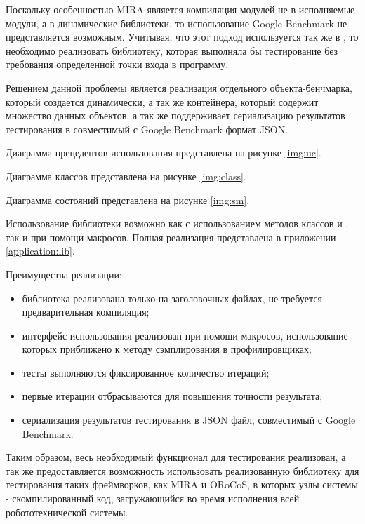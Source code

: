 Поскольку особенностью MIRA является компиляция модулей не в исполняемые модули, а в динамические библиотеки, то использование Google Benchmark не представляется возможным. Учитывая, что этот подход используется так же в \toolchain{}, то необходимо реализовать библиотеку, которая выполняла бы тестирование без требования определенной точки входа в программу.

Решением данной проблемы является реализация отдельного объекта-бенчмарка, который создается динамически, а так же контейнера, который содержит множество данных объектов, а так же поддерживает сериализацию результатов тестирования в совместимый с Google Benchmark формат JSON.


Диаграмма прецедентов использования представлена на рисунке \ref{img:uc}. 

Диаграмма классов представлена на рисунке \ref{img:class}. 

Диаграмма состояний представлена на рисунке \ref{img:sm}. 

Использование библиотеки возможно как с использованием методов классов  и , так и при помощи макросов. Полная реализация представлена в приложении \ref{application:lib}.

Преимущества реализации:
\begin{itemize}[noitemsep]
	\item библиотека реализована только на заголовочных файлах, не требуется предварительная компиляция;
	\item интерфейс использования реализован при помощи макросов, использование которых приближено к методу сэмплирования в профилировщиках;
	\item тесты выполняются фиксированное количество итераций;
	\item первые итерации отбрасываются для повышения точности результата;
	\item сериализация результатов тестирования в JSON файл, совместимый с Google Benchmark.
\end{itemize}

Таким образом, весь необходимый функционал для тестирования реализован, а так же предоставляется возможность использовать реализованную библиотеку для тестирования таких фреймворков, как MIRA и ORoCoS, в которых узлы системы - скомпилированный код, загружающийся во время исполнения всей робототехнической системы.


